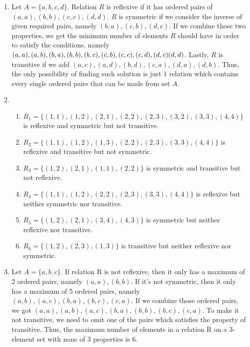 \documentclass[12pt]{article}
\begin{document}
\begin{enumerate}
\begin{enumerate}
	\item
	Let $A=\{a,b,c,d\}$. Relation $R$ is reflexive if it has ordered pairs of $(a,a),(b,b),(c,c),(d,d)$. $R$ is symmetric if we consider the inverse of given required pairs, namely $(b,a),(c,b),(d,c)$. If we combine those two properties, we get the minimum number of elements $R$ should have in order to satisfy the conditions, namely $(a,a),(a, b),(b,a),(b,b),(b,c),\\(c,b),(c,c),(c,d),(d,c)(d,d)$. Lastly, $R$ is transitive if we add $(a,c),(a,d),(b,d),(c,a),(d,a),(d,b)$. Thus, the only possibility of finding such solution is just 1 relation which contains every single ordered pairs that can be made from set $A$.\\

	\item
	\begin{enumerate}
		\item $R_1=\{(1,1),(1,2),(2,1),(2,2),(2,3),(3,2),(3,3),(4,4)\}$ is reflexive and symmetric but not transitive.
		\item $R_2=\{(1,1),(1,2),(1,3),(2,2),(2,3),(3,3),(4,4)\}$ is reflexive and transitive but not symmetric.
		\item $R_3=\{(1,2),(2,1),(1,1),(2,2)\}$ is symmetric and transitive but not reflexive.
		\item $R_4=\{(1,1),(1,2),(2,2),(2,3),(3,3),(4,4)\}$ is reflexive but neither symmetric nor transitive.
		\item $R_5=\{(1,2),(2,1),(3,4),(4,3)\}$ is symmetric but neither reflexive nor transitive.
		\item $R_6=\{(1,2),(2,3),(1,3)\}$ is transitive but neither reflexive nor symmetric.\\
	\end{enumerate}

	\item
	Let $A=\{a,b,c\}$. If relation R is not reflexive, then it only has a maximum of 2 ordered pairs, namely $(a,a),(b,b)$. If it's not symmetric, then it only has a maximum of 5 ordered pairs, namely $(a,b),(a,c),(b,a),(b,c),(c,a)$. If we combine those ordered pairs, we got $(a,a),(a,b),(a,c),(b,a),(b,b),(b,c),(c,a)$. To make it not transitive, we need to omit one of the pairs which satisfies the property of transitive. Thus, the maximum number of elements in a relation R on a 3-element set with none of 3 properties is 6.\\


\end{enumerate}
\end{enumerate}
\end{document}

